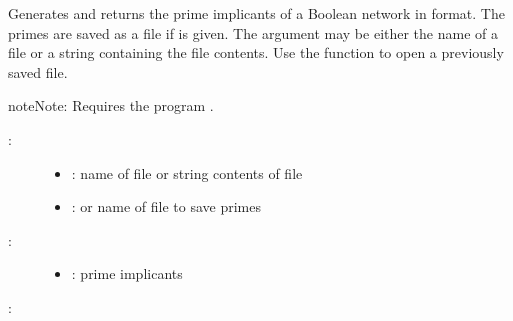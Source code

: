 \documentclass[letterpaper,10pt,english]{sphinxmanual}
\begin{document}
\begin{fulllineitems}
\label{\detokenize{FileExchange:PyBoolNet.FileExchange.bnet2primes}}
Generates and returns the prime implicants of a Boolean network in {\hyperref[\detokenize{Installation:installation-boolnet}]{}} format.
The primes are saved as a  file if  is given.
The argument  may be either the name of a  file or a string containing the file contents.
Use the function {\hyperref[\detokenize{FileExchange:read-primes}]{}} to open a previously saved  file.

\begin{sphinxadmonition}{note}{Note:}
Requires the program {\hyperref[\detokenize{Installation:installation-bnettoprime}]{}}.
\end{sphinxadmonition}
\begin{description}
\item[{:}] \leavevmode\begin{itemize}
\item {} 
: name of  file or string contents of file

\item {} 
:  or name of  file to save primes

\end{itemize}

\item[{:}] \leavevmode\begin{itemize}
\item {} 
: prime implicants

\end{itemize}

\end{description}

:


\end{fulllineitems}
\end{document}
